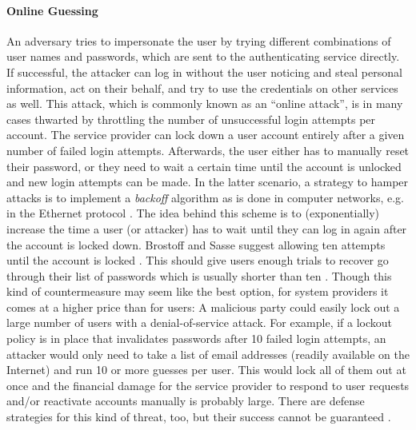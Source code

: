 \paragraph{Online Guessing} 
An adversary tries to impersonate the user by trying different combinations of user names and passwords, which are sent to the authenticating service directly. If successful, the attacker can log in without the user noticing and steal personal information, act on their behalf, and try to use the credentials on other services as well. 
	This attack, which is commonly known as an ``online attack'', is in many cases thwarted by throttling the number of unsuccessful login attempts per account. The service provider can lock down a user account entirely after a given number of failed login attempts. Afterwards, the user either has to manually reset their password, or they need to wait a certain time until the account is unlocked and new login attempts can be made. In the latter scenario, a strategy to hamper attacks is to implement a \textit{backoff} algorithm as is done in computer networks, e.g. in the Ethernet protocol \cite[p. 285]{Tanenbaum2011ComputerNetworks}. The idea behind this scheme is to (exponentially) increase the time a user (or attacker) has to wait until they can log in again after the account is locked down. Brostoff and Sasse suggest allowing ten attempts until the account is locked \cite{Brostoff2003TenStrikes}. This should give users enough trials to recover go through their list of passwords which is usually shorter than ten \cite{Florencio2007LargeScaleStudyPasswordHabits}. Though this kind of countermeasure may seem like the best option, for system providers it comes at a higher price than for users: A malicious party could easily lock out a large number of users with a denial-of-service attack. For example, if a lockout policy is in place that invalidates passwords after 10 failed login attempts, an attacker would only need to take a list of email addresses (readily available on the Internet) and run 10 or more guesses per user. This would lock all of them out at once and the financial damage for the service provider to respond to user requests and/or reactivate accounts manually is probably large. There are defense strategies for this kind of threat, too, but their success cannot be guaranteed \cite{Florencio2010WhereDoPoliciesComeFrom}.
	
